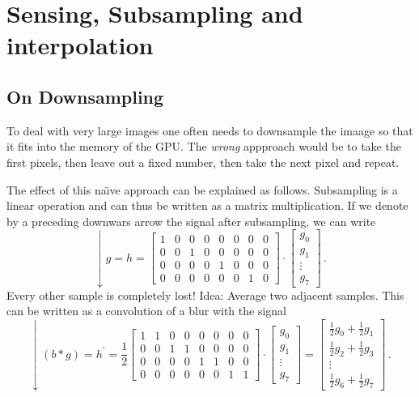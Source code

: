 \chapter{Sensing, Subsampling and interpolation}%
\label{chap:02}
\setcounter{section}{1}
\section{On Downsampling}
To deal with very large images one often needs to downsample the
imaage so that it fits into the memory of the GPU. The \emph{wrong}
appproach would be to take the first pixels, then leave out a fixed
number, then take the next pixel and repeat.  

The effect of this na\"\i{}ve approach can be explained as follows.
Subsampling is a linear operation and can thus be written as a matrix
multiplication. If we denote by a preceding downwars arrow the signal
after subsampling, we can write
\begin{equation*}
  \downarrow g = h =
  \begin{bmatrix}
    1 & 0 & 0 & 0 & 0 & 0 & 0 & 0 \\
    0 & 0 & 1 & 0 & 0 & 0 & 0 & 0 \\
    0 & 0 & 0 & 0 & 1 & 0 & 0 & 0 \\
    0 & 0 & 0 & 0 & 0 & 0 & 1 & 0
  \end{bmatrix}
  \cdot
  \begin{bmatrix}
    g_0 \\ g_1 \\ \vdots \\ g_7
  \end{bmatrix}\,.
\end{equation*}
Every other sample is completely lost! Idea: Average two adjacent
samples. This can be written as a convolution of a blur with the
signal
\begin{equation*}
  \downarrow (b \ast g) = h^\prime = \frac{1}{2}
  \begin{bmatrix}
    1 & 1 & 0 & 0 & 0 & 0 & 0 & 0 \\
    0 & 0 & 1 & 1 & 0 & 0 & 0 & 0 \\
    0 & 0 & 0 & 0 & 1 & 1 & 0 & 0 \\
    0 & 0 & 0 & 0 & 0 & 0 & 1 & 1
  \end{bmatrix}
  \cdot
  \begin{bmatrix}
    g_0 \\ g_1 \\ \vdots \\ g_7
  \end{bmatrix}
  =
  \begin{bmatrix}
    \frac{1}{2} g_0 + \frac{1}{2} g_1 \\
    \frac{1}{2} g_2 + \frac{1}{2} g_3 \\
    \vdots \\
    \frac{1}{2} g_6 + \frac{1}{2} g_7
  \end{bmatrix}\,.
\end{equation*}
